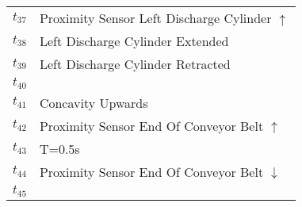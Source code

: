 \begin{table}[H]
\begin{tabular}{M{5cm}M{10cm}}
\hyperlink{partialNet:t37}{\hypertarget{partialTable:t37}{$t_{37}$}} & Proximity Sensor Left Discharge Cylinder \(\uparrow\)\\
\hyperlink{partialNet:t38}{\hypertarget{partialTable:t38}{$t_{38}$}} & Left Discharge Cylinder Extended\\
\hyperlink{partialNet:t39}{\hypertarget{partialTable:t39}{$t_{39}$}} & Left Discharge Cylinder Retracted\\
\hyperlink{partialNet:t40}{\hypertarget{partialTable:t40}{$t_{40}$}} & \\
\hyperlink{partialNet:t41}{\hypertarget{partialTable:t41}{$t_{41}$}} & Concavity Upwards\\
\hyperlink{partialNet:t42}{\hypertarget{partialTable:t42}{$t_{42}$}} & Proximity Sensor End Of Conveyor Belt \(\uparrow\)\\
\hyperlink{partialNet:tt43}{\hypertarget{partialTable:tt43}{$t_{43}$}} & T=0.5s\\
\hyperlink{partialNet:t44}{\hypertarget{partialTable:t44}{$t_{44}$}} & Proximity Sensor End Of Conveyor Belt \(\downarrow\)\\
\hyperlink{partialNet:t45}{\hypertarget{partialTable:t45}{$t_{45}$}} & \\
\end{tabular}
\end{table}
